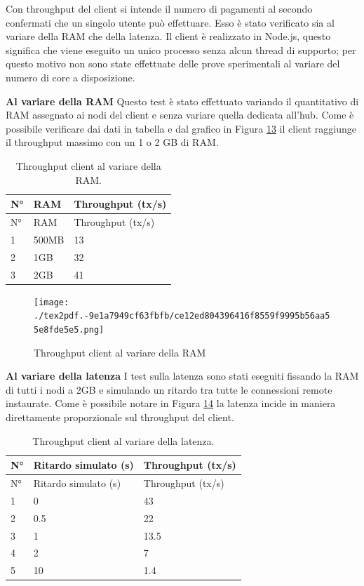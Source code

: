 \documentclass[12pt,italian,]{book}
\begin{document}
Con throughput del client si intende il numero di pagamenti al secondo confermati che un singolo utente può effettuare. Esso è stato verificato sia al variare della RAM che della latenza. Il client è realizzato in Node.js, questo significa che viene eseguito un unico processo senza alcun thread di supporto; per questo motivo non sono state effettuate delle prove sperimentali al variare del numero di core a disposizione.

\textbf{\textbf{Al variare della RAM}} Questo test è stato effettuato variando il quantitativo di RAM assegnato ai nodi del client e senza variare quella dedicata all'hub. Come è possibile verificare dai dati in tabella e dal grafico in Figura \protect\hyperlink{client-ram-chart}{13} il client raggiunge il throughput massimo con un 1 o 2 GB di RAM.

\begin{longtable}[]{@{}lll@{}}
\caption{\protect\hypertarget{client-ram-table}{}{}Throughput client al variare della RAM.}\tabularnewline
\toprule
N° & RAM & Throughput (tx/s)\tabularnewline
\midrule
\endfirsthead
\toprule
N° & RAM & Throughput (tx/s)\tabularnewline
\midrule
\endhead
1 & 500MB & 13\tabularnewline
2 & 1GB & 32\tabularnewline
3 & 2GB & 41\tabularnewline
\bottomrule
\end{longtable}

\begin{figure}
\centering
\texttt{[image: ./tex2pdf.-9e1a7949cf63fbfb/ce12ed804396416f8559f9995b56aa55e8fde5e5.png]}
\caption{\protect\hypertarget{client-ram-chart}{}{}Throughput client al variare della RAM}
\end{figure}

\textbf{\textbf{Al variare della latenza}} I test sulla latenza sono stati eseguiti fissando la RAM di tutti i nodi a 2GB e simulando un ritardo tra tutte le connessioni remote instaurate. Come è possibile notare in Figura \protect\hyperlink{client-latenza-chart}{14} la latenza incide in maniera direttamente proporzionale sul throughput del client.

\begin{longtable}[]{@{}lll@{}}
\caption{\protect\hypertarget{client-latenza-table}{}{}Throughput client al variare della latenza.}\tabularnewline
\toprule
N° & Ritardo simulato (s) & Throughput (tx/s)\tabularnewline
\midrule
\endfirsthead
\toprule
N° & Ritardo simulato (s) & Throughput (tx/s)\tabularnewline
\midrule
\endhead
1 & 0 & 43\tabularnewline
2 & 0.5 & 22\tabularnewline
3 & 1 & 13.5\tabularnewline
4 & 2 & 7\tabularnewline
5 & 10 & 1.4\tabularnewline
\bottomrule
\end{longtable}
\end{document}
